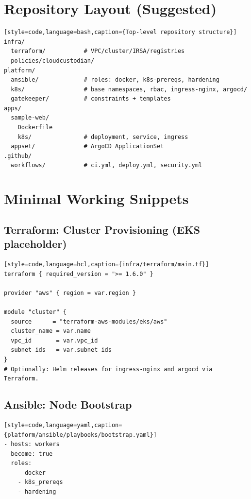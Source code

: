 \documentclass[11pt]{article}
\begin{document}
\section{Repository Layout (Suggested)}
\begin{verbatim}[style=code,language=bash,caption={Top-level repository structure}]
infra/
  terraform/           # VPC/cluster/IRSA/registries
  policies/cloudcustodian/
platform/
  ansible/             # roles: docker, k8s-prereqs, hardening
  k8s/                 # base namespaces, rbac, ingress-nginx, argocd/
  gatekeeper/          # constraints + templates
apps/
  sample-web/
    Dockerfile
    k8s/               # deployment, service, ingress
  appset/              # ArgoCD ApplicationSet
.github/
  workflows/           # ci.yml, deploy.yml, security.yml
\end{verbatim}

\section{Minimal Working Snippets}

\subsection{Terraform: Cluster Provisioning (EKS placeholder)}
\begin{verbatim}[style=code,language=hcl,caption={infra/terraform/main.tf}]
terraform { required_version = ">= 1.6.0" }

provider "aws" { region = var.region }

module "cluster" {
  source      = "terraform-aws-modules/eks/aws"
  cluster_name = var.name
  vpc_id       = var.vpc_id
  subnet_ids   = var.subnet_ids
}
# Optionally: Helm releases for ingress-nginx and argocd via Terraform.
\end{verbatim}

\subsection{Ansible: Node Bootstrap}
\begin{verbatim}[style=code,language=yaml,caption={platform/ansible/playbooks/bootstrap.yaml}]
- hosts: workers
  become: true
  roles:
    - docker
    - k8s_prereqs
    - hardening
\end{verbatim}
\end{document}
